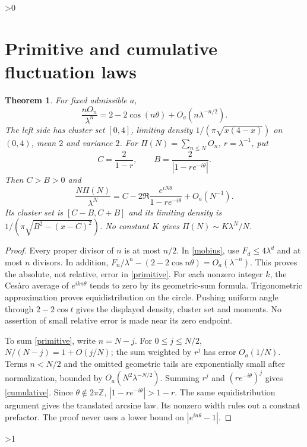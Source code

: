 \documentclass[10pt]{article}
\newtheorem{theorem}{Theorem}
\begin{document}
\ifnum\CRevisionRound>0
\section{Primitive and cumulative fluctuation laws}
\begin{theorem}
For fixed admissible $a$,
\begin{equation}\label{primitive}
 \frac{nO_n}{\lambda^n}=2-2\cos(n\theta)
       +O_a(n\lambda^{-n/2}).
\end{equation}
The left side has cluster set $[0,4]$, limiting density
$1/(\pi\sqrt{x(4-x)})$ on $(0,4)$, mean $2$ and variance $2$.
For $\Pi(N)=\sum_{n\le N}O_n$, $r=\lambda^{-1}$, put
\[
 C=\frac2{1-r},\qquad B=\frac2{|1-re^{-i\theta}|}.
\]
Then $C>B>0$ and
\begin{equation}\label{cumulative}
 \frac{N\Pi(N)}{\lambda^N}
 =C-2\Re\frac{e^{iN\theta}}{1-re^{-i\theta}}+O_a(N^{-1}).
\end{equation}
Its cluster set is $[C-B,C+B]$ and its limiting density is
$1/(\pi\sqrt{B^2-(x-C)^2})$. No constant $K$ gives
$\Pi(N)\sim K\lambda^N/N$.
\end{theorem}
\begin{proof}
Every proper divisor of $n$ is at most $n/2$. In \eqref{mobius}, use
$F_d\le4\lambda^d$ and at most $n$ divisors. In addition,
$F_n/\lambda^n-(2-2\cos n\theta)=O_a(\lambda^{-n})$.
This proves the absolute, not relative, error in \eqref{primitive}.
For each nonzero integer $k$, the Cesàro average of $e^{ikn\theta}$
tends to zero by its geometric-sum formula. Trigonometric approximation
proves equidistribution on the circle. Pushing uniform angle through
$2-2\cos t$ gives the displayed density, cluster set and moments.
No assertion of small relative error is made near its zero endpoint.

To sum \eqref{primitive}, write $n=N-j$. For $0\le j\le N/2$,
$N/(N-j)=1+O(j/N)$; the sum weighted by $r^j$ has error $O_a(1/N)$.
Terms $n<N/2$ and the omitted geometric tails are exponentially small
after normalization, bounded by $O_a(N^2\lambda^{-N/2})$.
Summing $r^j$ and $(re^{-i\theta})^j$ gives \eqref{cumulative}.
Since $\theta\notin2\pi\mathbb Z$, $|1-re^{-i\theta}|>1-r$.
The same equidistribution argument gives the translated arcsine law.
Its nonzero width rules out a constant prefactor. The proof never uses
a lower bound on $|e^{in\theta}-1|$.
\end{proof}
\fi

\ifnum\CRevisionRound>1
\end{document}
